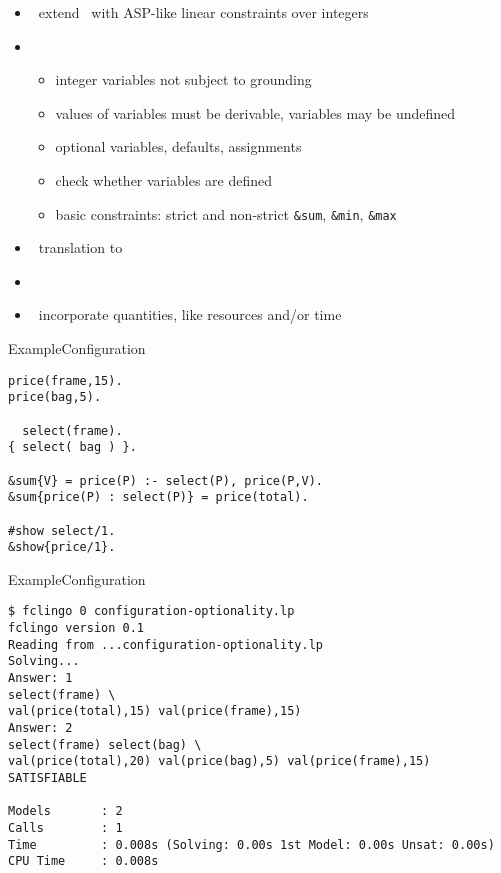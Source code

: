 \begin{frame}{\fclingo}
  \begin{itemize}
  \item {} \ extend \clingo\ with ASP-like linear constraints over integers
  \item {} \
    \begin{itemize}
    \item integer variables not subject to grounding
    \item values of variables must be derivable, variables may be undefined
    \item optional variables, defaults, assignments
    \item check whether variables are defined
    \item basic constraints: strict and non-strict \lstinline{&sum}, \lstinline{&min}, \lstinline{&max}
    \end{itemize}
  \item {} \ translation to \clingcon
  \item {} \ \cite{cafascwa20a,cafascwa20b}
  \item {} \ incorporate quantities, like resources and/or time
  \end{itemize}
\end{frame}
\begin{frame}[fragile]{Example}{Configuration}
\begin{lstlisting}
price(frame,15).
price(bag,5).

  select(frame).
{ select( bag ) }.

&sum{V} = price(P) :- select(P), price(P,V).
&sum{price(P) : select(P)} = price(total).

#show select/1.
&show{price/1}.
\end{lstlisting}
\end{frame}
\begin{frame}[fragile]{Example}{Configuration}
\begin{adjustbox}{max totalsize={\textwidth}{.83\textheight},keepaspectratio}
\begin{lstlisting}
$ fclingo 0 configuration-optionality.lp
fclingo version 0.1
Reading from ...configuration-optionality.lp
Solving...
Answer: 1
select(frame) \
val(price(total),15) val(price(frame),15)
Answer: 2
select(frame) select(bag) \
val(price(total),20) val(price(bag),5) val(price(frame),15)
SATISFIABLE

Models       : 2
Calls        : 1
Time         : 0.008s (Solving: 0.00s 1st Model: 0.00s Unsat: 0.00s)
CPU Time     : 0.008s
\end{lstlisting}
\end{adjustbox}
\end{frame}
%
